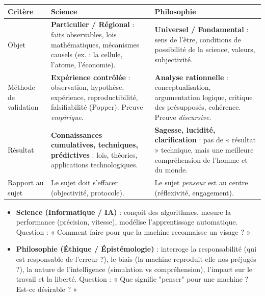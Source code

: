 \documentclass[11pt]{article}
\begin{document}
\begin{propriete}
\begin{center}
\begin{tabularx}{\linewidth}{|l|X|X|}
\hline
\rowcolor{popblueL} \textbf{Critère} & \textbf{Science} & \textbf{Philosophie} \\
\hline
Objet & \textbf{Particulier / Régional} : faits observables, lois mathématiques, mécanismes causels (ex. : la cellule, l'atome, l'économie). & \textbf{Universel / Fondamental} : sens de l'être, conditions de possibilité de la science, valeurs, subjectivité. \\
\hline
Méthode de validation & \textbf{Expérience contrôlée} : observation, hypothèse, expérience, reproductibilité, falsifiabilité (Popper). Preuve \emph{empirique}. & \textbf{Analyse rationnelle} : conceptualisation, argumentation logique, critique des présupposés, cohérence. Preuve \emph{discursive}. \\
\hline
Résultat & \textbf{Connaissances cumulatives, techniques, prédictives} : lois, théories, applications technologiques. & \textbf{Sagesse, lucidité, clarification} : pas de « résultat » technique, mais une meilleure compréhension de l'homme et du monde. \\
\hline
Rapport au sujet & Le sujet doit s'effacer (objectivité, protocole). & Le sujet \emph{penseur} est au centre (réflexivité, engagement). \\
\hline
\end{tabularx}
\end{center}
\end{propriete}

\begin{exemplebox}
\begin{itemize}
\item \textbf{Science (Informatique / IA)} : conçoit des algorithmes, mesure la performance (précision, vitesse), modélise l'apprentissage automatique. Question : « Comment faire pour que la machine reconnaisse un visage ? »
\item \textbf{Philosophie (Éthique / Épistémologie)} : interroge la responsabilité (qui est responsable de l'erreur ?), le biais (la machine reproduit-elle nos préjugés ?), la nature de l'intelligence (simulation vs compréhension), l'impact sur le travail et la liberté. Question : « Que signifie "penser" pour une machine ? Est-ce désirable ? »
\end{itemize}
\end{exemplebox}
\end{document}

